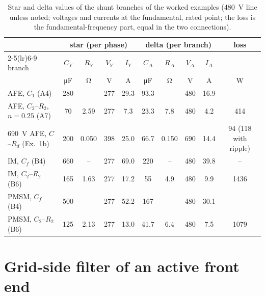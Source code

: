 \documentclass[10pt,a4paper]{scrartcl}
\newcommand{\Cf}{C_{f}}
\begin{document}
\begin{onehalfspace}
\begin{table}[htb]
\centering\small\begin{onehalfspace}
\setlength{\tabcolsep}{4pt}
\caption{Star and delta values of the shunt branches of the worked examples (\SI{480}{V} line unless noted; voltages and currents at the fundamental, rated point; the loss is the fundamental-frequency part, equal in the two connections).}
\label{tab:stardelta}
\begin{tabular}{@{}l cccc cccc c@{}}
\toprule
 & \multicolumn{4}{c}{star (per phase)} & \multicolumn{4}{c}{delta (per branch)} & loss \\
\cmidrule(lr){2-5}\cmidrule(lr){6-9}
branch & $C_Y$ & $R_Y$ & $V_Y$ & $I_Y$ & $C_\Delta$ & $R_\Delta$ & $V_\Delta$ & $I_\Delta$ & \\
 & \si{\micro F} & \si{\ohm} & V & A & \si{\micro F} & \si{\ohm} & V & A & W \\
\midrule
AFE, $C_1$ (A4)                        & 280 & --    & 277 & 29.3 & 93.3 & --    & 480 & 16.9 & --   \\
AFE, $C_2$--$R_2$, $n = 0.25$ (A7)     & 70  & 2.59  & 277 & 7.3  & 23.3 & 7.8   & 480 & 4.2  & 414  \\
\SI{690}{V} AFE, $C$--$R_d$ (Ex.~1b)   & 200 & 0.050 & 398 & 25.0 & 66.7 & 0.150 & 690 & 14.4 & 94 (118 with ripple) \\
IM, $\Cf$ (B4)                         & 660 & --    & 277 & 69.0 & 220  & --    & 480 & 39.8 & --   \\
IM, $C_2$--$R_2$ (B6)                  & 165 & 1.63  & 277 & 17.2 & 55   & 4.9   & 480 & 9.9  & 1436 \\
PMSM, $\Cf$ (B4)                       & 500 & --    & 277 & 52.2 & 167  & --    & 480 & 30.1 & --   \\
PMSM, $C_2$--$R_2$ (B6)                & 125 & 2.13  & 277 & 13.0 & 41.7 & 6.4   & 480 & 7.5  & 1079 \\
\bottomrule
\end{tabular}
\end{onehalfspace}
\end{table}


\section{Grid-side filter of an active front end}
\label{sec:grid}


\end{onehalfspace}
\end{document}
